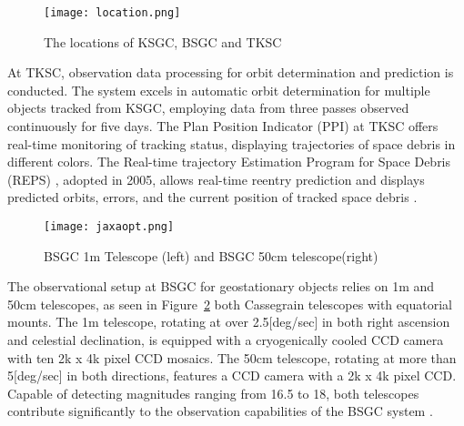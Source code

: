 \begin{figure}[h!]
	\centering
	\texttt{[image: location.png]}
	\caption{The locations of KSGC, BSGC and TKSC \cite{jaxa5}}\label{fig:jaxa}
\end{figure}

At TKSC, observation data processing for orbit determination and prediction is conducted. The system excels in automatic orbit determination for multiple objects tracked from KSGC, employing data from three passes observed continuously for five days. The Plan Position Indicator (PPI) at TKSC offers real-time monitoring of tracking status, displaying trajectories of space debris in different colors. The Real-time trajectory Estimation Program for Space Debris (REPS) \cite{reps}, adopted in 2005, allows real-time reentry prediction and displays predicted orbits, errors, and the current position of tracked space debris \cite{jaxa2}.\\

\begin{figure}[h!]
	\centering
	\texttt{[image: jaxaopt.png]}
	\caption{ BSGC 1m Telescope (left) and BSGC 50cm telescope(right) \cite{jaxa2}}\label{fig:jaxopt}
\end{figure}

The observational setup at BSGC for geostationary objects relies on 1m and 50cm telescopes, as seen in Figure~\ref{fig:jaxopt} both Cassegrain telescopes with equatorial mounts. The 1m telescope, rotating at over 2.5[deg/sec] in both right ascension and celestial declination, is equipped with a cryogenically cooled CCD camera with ten 2k x 4k pixel CCD mosaics. The 50cm telescope, rotating at more than 5[deg/sec] in both directions, features a CCD camera with a 2k x 4k pixel CCD. Capable of detecting magnitudes ranging from 16.5 to 18, both telescopes contribute significantly to the observation capabilities of the BSGC system \cite{jaxa2,jaxa4}.\\


\pagebreak

